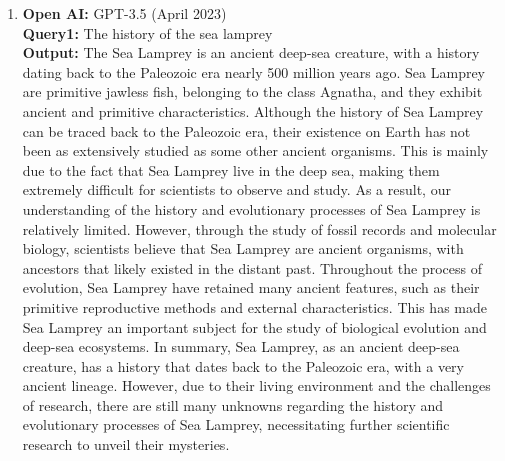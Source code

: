 \documentclass{mcmthesis}
\begin{document}
\begin{appendices}
\begin{enumerate}
          The method for creating a bubble chart varies depending on the tool used, but typically follows the basic steps outlined above. Hopefully, these steps will help you create a clear and easy-to-understand bubble chart.
    \item \textbf{Open AI:} GPT-3.5 (April 2023)\\
          \textbf{Query1:} The history of the sea lamprey\\
          \textbf{Output:} The Sea Lamprey is an ancient deep-sea creature, with a history dating back to the Paleozoic era nearly 500 million years ago. Sea Lamprey are primitive jawless fish, belonging to the class Agnatha, and they exhibit ancient and primitive characteristics.
          Although the history of Sea Lamprey can be traced back to the Paleozoic era, their existence on Earth has not been as extensively studied as some other ancient organisms. This is mainly due to the fact that Sea Lamprey live in the deep sea, making them extremely difficult for scientists to observe and study. As a result, our understanding of the history and evolutionary processes of Sea Lamprey is relatively limited.
          However, through the study of fossil records and molecular biology, scientists believe that Sea Lamprey are ancient organisms, with ancestors that likely existed in the distant past. Throughout the process of evolution, Sea Lamprey have retained many ancient features, such as their primitive reproductive methods and external characteristics. This has made Sea Lamprey an important subject for the study of biological evolution and deep-sea ecosystems.
          In summary, Sea Lamprey, as an ancient deep-sea creature, has a history that dates back to the Paleozoic era, with a very ancient lineage. However, due to their living environment and the challenges of research, there are still many unknowns regarding the history and evolutionary processes of Sea Lamprey, necessitating further scientific research to unveil their mysteries.

  \end{enumerate}
  \end{appendices}
\end{document}
